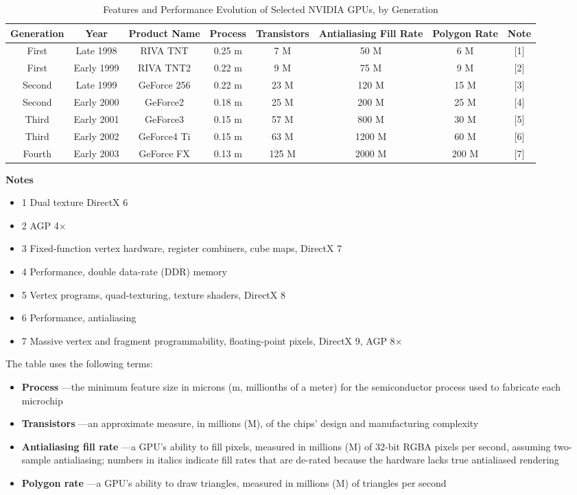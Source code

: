 \documentclass[../main.tex]{subfiles}
\begin{document}
\FloatBarrier
\begin{table}
\centering
\begin{tabular}{ |c|c|c|c|c|c|c|c| } 
 \hline
 Generation & Year & Product Name & Process & Transistors & Antialiasing Fill Rate & Polygon Rate & Note \\
 \hline
 First & Late 1998 & RIVA TNT & 0.25 m & 7 M & 50 M & 6 M & [1] \\
 First & Early 1999 & RIVA TNT2 & 0.22 m & 9 M & 75 M & 9 M & [2] \\
 Second & Late 1999 & GeForce 256 & 0.22 m & 23 M & 120 M & 15 M & [3] \\
 Second & Early 2000 & GeForce2 & 0.18 m & 25 M & 200 M & 25 M & [4] \\
 Third & Early 2001 & GeForce3 & 0.15 m & 57 M & 800 M & 30 M & [5] \\
 Third & Early 2002 & GeForce4 Ti & 0.15 m & 63 M & 1200 M & 60 M & [6] \\
 Fourth & Early 2003 & GeForce FX & 0.13 m & 125 M & 2000 M & 200 M & [7] \\
 \hline
\end{tabular}
\caption{Features and Performance Evolution of Selected NVIDIA GPUs, by Generation}
\label{table:1-1}

\textbf{Notes}
\begin{itemize}
\item[] 1 Dual texture DirectX 6
\item[] 2 AGP 4×
\item[] 3 Fixed-function vertex hardware, register combiners, cube maps, DirectX 7
\item[] 4 Performance, double data-rate (DDR) memory
\item[] 5 Vertex programs, quad-texturing, texture shaders, DirectX 8
\item[] 6 Performance, antialiasing
\item[] 7 Massive vertex and fragment programmability, floating-point pixels, DirectX 9, AGP 8×
\end{itemize}

\end{table}
\FloatBarrier

The table uses the following terms:

\FloatBarrier
\begin{itemize}
    \item \textbf{Process} —the minimum feature size in microns (m, millionths of a meter) for the semiconductor process used to fabricate each microchip
    \item \textbf{Transistors} —an approximate measure, in millions (M), of the chips' design and manufacturing complexity
    \item \textbf{Antialiasing fill rate} —a GPU's ability to fill pixels, measured in millions (M) of 32-bit RGBA pixels per second, assuming two-sample antialiasing; numbers in italics indicate fill rates that are de-rated because the hardware lacks true antialiased rendering
    \item \textbf{Polygon rate} —a GPU's ability to draw triangles, measured in millions (M) of triangles per second
\end{itemize}
\FloatBarrier
\end{document}
